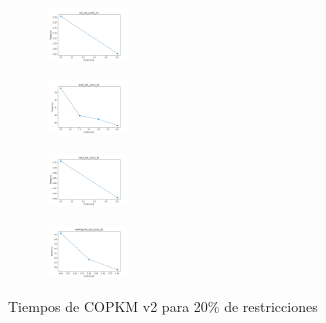 \begin{figure}[H]
\begin{subfigure}
    \end{subfigure}
    \hfill
    \begin{subfigure}
        \centering
        \includegraphics[width=0.234\textwidth]{img/copkm2/iris_set_const_20_3773969821_time.png}
    \end{subfigure}
    \hfill
    \begin{subfigure}
        \centering
        \includegraphics[width=0.234\textwidth]{img/copkm2/ecoli_set_const_20_3773969821_time.png}
    \end{subfigure}
    \hfill
    \begin{subfigure}
        \centering
        \includegraphics[width=0.234\textwidth]{img/copkm2/rand_set_const_20_3773969821_time.png}
    \end{subfigure}
    \hfill
    \begin{subfigure}
        \centering
        \includegraphics[width=0.234\textwidth]{img/copkm2/newthyroid_set_const_20_3773969821_time.png}
    \end{subfigure}
    \caption{Tiempos de COPKM v2 para 20\% de restricciones}
\end{figure}

\vspace*{\fill}
\newpage
\vspace*{\fill}

